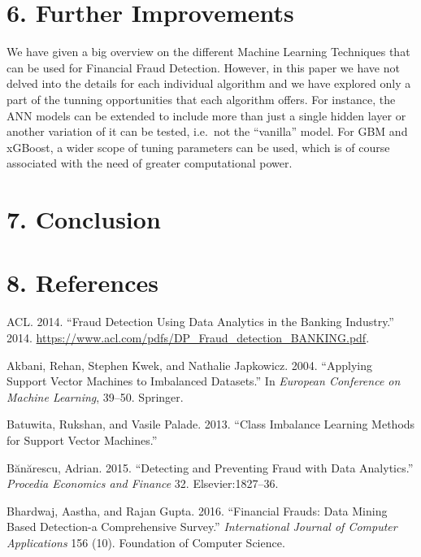 \documentclass[12pt,]{article}
\begin{document}
\hypertarget{further-improvements}{%
\section{6. Further Improvements}\label{further-improvements}}

We have given a big overview on the different Machine Learning
Techniques that can be used for Financial Fraud Detection. However, in
this paper we have not delved into the details for each individual
algorithm and we have explored only a part of the tunning opportunities
that each algorithm offers. For instance, the ANN models can be extended
to include more than just a single hidden layer or another variation of
it can be tested, i.e.~not the ``vanilla'' model. For GBM and xGBoost, a
wider scope of tuning parameters can be used, which is of course
associated with the need of greater computational power.

\hypertarget{conclusion}{%
\section{7. Conclusion}\label{conclusion}}

\hypertarget{references}{%
\section*{8. References}\label{references}}

\hypertarget{refs}{}
\leavevmode\hypertarget{ref-fraudanalyticsacl}{}%
ACL. 2014. ``Fraud Detection Using Data Analytics in the Banking
Industry.'' 2014.
\url{https://www.acl.com/pdfs/DP_Fraud_detection_BANKING.pdf}.

\leavevmode\hypertarget{ref-akbani2004applying}{}%
Akbani, Rehan, Stephen Kwek, and Nathalie Japkowicz. 2004. ``Applying
Support Vector Machines to Imbalanced Datasets.'' In \emph{European
Conference on Machine Learning}, 39--50. Springer.

\leavevmode\hypertarget{ref-batuwita2013class}{}%
Batuwita, Rukshan, and Vasile Palade. 2013. ``Class Imbalance Learning
Methods for Support Vector Machines.''

\leavevmode\hypertarget{ref-buanuarescu2015detecting}{}%
Bănărescu, Adrian. 2015. ``Detecting and Preventing Fraud with Data
Analytics.'' \emph{Procedia Economics and Finance} 32.
Elsevier:1827--36.

\leavevmode\hypertarget{ref-bhardwaj2016financial}{}%
Bhardwaj, Aastha, and Rajan Gupta. 2016. ``Financial Frauds: Data Mining
Based Detection-a Comprehensive Survey.'' \emph{International Journal of
Computer Applications} 156 (10). Foundation of Computer Science.
\end{document}
